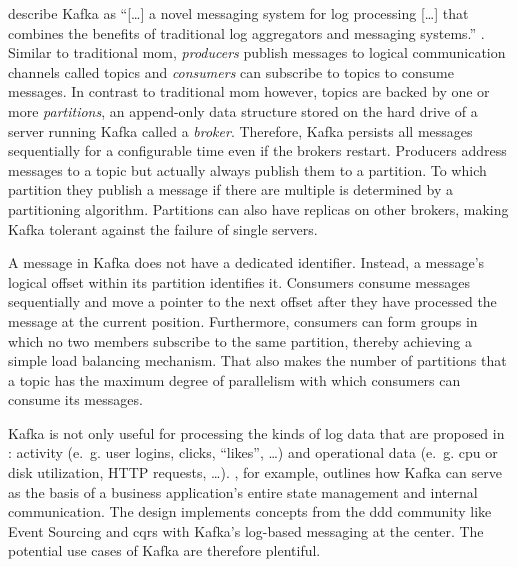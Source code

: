 \citeauthor{kreps_kafka_2011} describe Kafka as \enquote{[\ldots] a novel messaging system for log processing [\ldots] that combines the benefits of traditional log aggregators and messaging systems.} \parencite{kreps_kafka_2011}.
Similar to traditional \gls{mom}, \emph{producers} publish messages to logical communication channels called topics and \emph{consumers} can subscribe to topics to consume messages.
In contrast to traditional \gls{mom} however, topics are backed by one or more \emph{partitions}, an append-only data structure stored on the hard drive of a server running Kafka called a \emph{broker}.
Therefore, Kafka persists all messages sequentially for a configurable time even if the brokers restart.
Producers address messages to a topic but actually always publish them to a partition.
To which partition they publish a message if there are multiple is determined by a partitioning algorithm.
Partitions can also have replicas on other brokers, making Kafka tolerant against the failure of single servers.
\parencite{kreps_kafka_2011}

A message in Kafka does not have a dedicated identifier.
Instead, a message's logical offset within its partition identifies it.
Consumers consume messages sequentially and move a pointer to the next offset after they have processed the message at the current position.
Furthermore, consumers can form groups in which no two members subscribe to the same partition, thereby achieving a simple load balancing mechanism.
That also makes the number of partitions that a topic has the maximum degree of parallelism with which consumers can consume its messages.
\parencite{kreps_kafka_2011}

Kafka is not only useful for processing the kinds of log data that are proposed in \cite{kreps_kafka_2011}: activity (e.~g. user logins, clicks, \enquote{likes}, \ldots) and operational data (e.~g. \gls{cpu} or disk utilization, HTTP requests, \ldots).
\cite{stopford_designing_2018}, for example, outlines how Kafka can serve as the basis of a business application's entire state management and internal communication.
The design implements concepts from the \gls{ddd} community like Event Sourcing \parencite{fowler_event_sourcing_2005} and \gls{cqrs} \parencite{fowler_cqrs_2011} with Kafka's log-based messaging at the center.
The potential use cases of Kafka are therefore plentiful.
